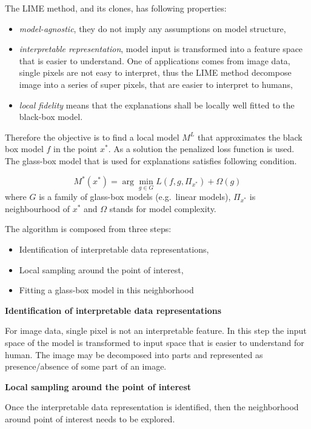 \documentclass[12pt,]{krantz}
\providecommand{\tightlist}{%
  \setlength{\itemsep}{0pt}\setlength{\parskip}{0pt}}
\theoremstyle{definition}
\theoremstyle{definition}
\theoremstyle{definition}
\theoremstyle{remark}
\begin{document}
The LIME method, and its clones, has following properties:

\begin{itemize}
\tightlist
\item
  \emph{model-agnostic}, they do not imply any assumptions on model
  structure,
\item
  \emph{interpretable representation}, model input is transformed into a
  feature space that is easier to understand. One of applications comes
  from image data, single pixels are not easy to interpret, thus the
  LIME method decompose image into a series of super pixels, that are
  easier to interpret to humans,
\item
  \emph{local fidelity} means that the explanations shall be locally
  well fitted to the black-box model.
\end{itemize}

Therefore the objective is to find a local model \(M^L\) that
approximates the black box model \(f\) in the point \(x^*\). As a
solution the penalized loss function is used. The glass-box model that
is used for explanations satisfies following condition.

\[
M^*(x^*) = \arg \min_{g \in G} L(f, g, \Pi_{x^*}) + \Omega (g) 
\] where \(G\) is a family of glass-box models (e.g.~linear models),
\(\Pi_{x^*}\) is neighbourhood of \(x^*\) and \(\Omega\) stands for
model complexity.

The algorithm is composed from three steps:

\begin{itemize}
\tightlist
\item
  Identification of interpretable data representations,
\item
  Local sampling around the point of interest,
\item
  Fitting a glass-box model in this neighborhood
\end{itemize}

\textbf{Identification of interpretable data representations}

For image data, single pixel is not an interpretable feature. In this
step the input space of the model is transformed to input space that is
easier to understand for human. The image may be decomposed into parts
and represented as presence/absence of some part of an image.

\textbf{Local sampling around the point of interest}

Once the interpretable data representation is identified, then the
neighborhood around point of interest needs to be explored.
\end{document}
